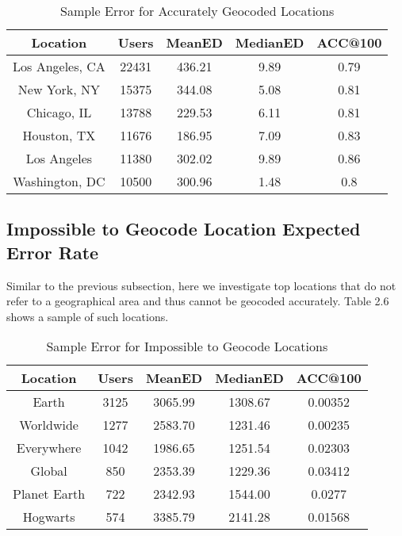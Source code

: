 \begin{table}
\small
\renewcommand{\arraystretch}{1.2}
\caption{ Sample Error for Accurately Geocoded Locations}
\label{table_ch2_5}
\centering
\begin{tabular}{|c|c|c|c|c|}
\hline
\bfseries Location & \bfseries Users & \bfseries MeanED & \bfseries MedianED & \bfseries ACC@100\\
\hline
Los Angeles, CA&22431&436.21&9.89&0.79\\
\hline
New York, NY&15375&344.08&5.08&0.81\\
\hline
Chicago, IL&13788&229.53&6.11&0.81\\
\hline
Houston, TX&11676&186.95&7.09&0.83\\
\hline
Los Angeles&11380&302.02&9.89&0.86\\
\hline
Washington, DC&10500&300.96&1.48&0.8\\
\hline
\end{tabular}
\end{table}

\subsection{Impossible to Geocode Location Expected Error Rate}
Similar to the previous subsection, here we investigate top locations that do not refer to a geographical area and thus cannot be geocoded accurately. Table 2.6 shows a sample of such locations. 

\begin{table}
\small
\renewcommand{\arraystretch}{1.2}
\caption{Sample Error for Impossible to Geocode Locations}
\label{table_ch2_6}
\centering
\begin{tabular}{|c|c|c|c|c|}
\hline
\bfseries Location & \bfseries Users & \bfseries MeanED & \bfseries MedianED \bfseries & \bfseries ACC@100\\
\hline
Earth&3125&3065.99&1308.67&0.00352\\
\hline
Worldwide&1277&2583.70&1231.46&0.00235\\
\hline
Everywhere&1042&1986.65&1251.54&0.02303\\
\hline
Global&850&2353.39&1229.36&0.03412\\
\hline
Planet Earth&722&2342.93&1544.00&0.0277\\
\hline
Hogwarts&574&3385.79&2141.28&0.01568\\
\hline
\end{tabular}
\end{table}


